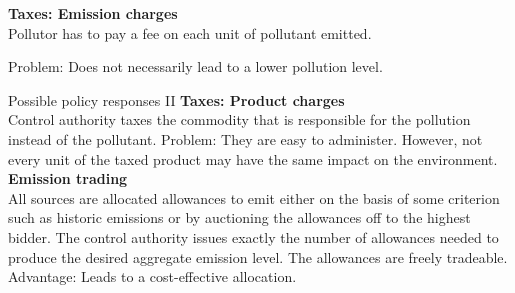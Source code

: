 	\textbf{Taxes: Emission charges} \\
  Pollutor has to pay a fee on each unit of pollutant emitted. %
  
  Problem: Does not necessarily lead to a lower pollution level.
  
 
Possible policy responses II
\textbf{Taxes: Product charges} \\
	Control authority taxes the commodity that is responsible for the pollution instead of the pollutant. %
	Problem: They are easy to administer. However, not every unit of the taxed product may have the same impact on the environment. \\
\textbf{Emission trading} \\
	All sources are allocated allowances to emit either on the basis of some criterion such as historic emissions or by auctioning the allowances off to the highest bidder.
	The control authority issues exactly the number of allowances needed to produce the desired aggregate emission level.
	The allowances are freely tradeable.
	Advantage: Leads to a cost-effective allocation.
	
	